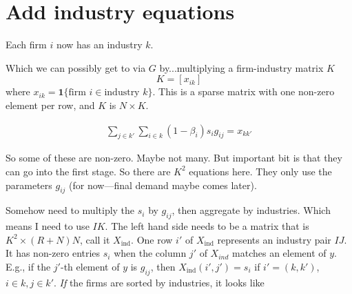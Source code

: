 \documentclass[12pt]{article}
\begin{document}
\section{Add industry equations}

Each firm $i$ now has an industry $k$. 

Which we can possibly get to via $G$ by...multiplying a firm-industry matrix $K$
\[
K = [x_{ik} ]
\]
where $x_{ik} = \mathbf{1} \{ \text{firm } i \in \text{industry } k \}$. This is a sparse matrix with one non-zero element per row, and $K$ is $N \times K$. 

\begin{gather}
\sum_{j \in k'} \sum_{i \in k} (1-\beta_i) s_i g_{ij} = x_{kk'}
\end{gather}
 
 So some of these are non-zero. Maybe not many. But important bit is that they can go into the first stage. So there are $K^2$ equations here. They only use the parameters $g_{ij}$ (for now---final demand maybe comes later).
 
 Somehow need to multiply the $s_i$ by $g_{ij}$, then aggregate by industries. Which means I need to use $IK$. The left hand side needs to be a matrix that is $K^2 \times (R+N)N$, call it $X_{\text{ind}}$. One row $i'$ of $X_{\text{ind}}$ represents an industry pair $IJ$. It has non-zero entries $s_i$ when the column $j'$ of $X_{ind}$ matches an element of $y$. E.g., if the $j'$-th element of $y$ is $g_{ij}$, then $X_{\text{ind}}(i',j') = s_i$ if $i'=(k,k')$, $i \in k, j \in k'$. \emph{If} the firms are sorted by industries, it looks like
\end{document}
